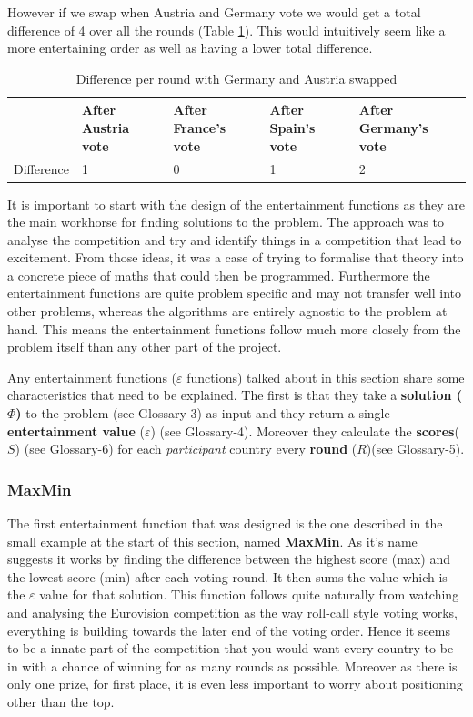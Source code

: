 \documentclass[12pt]{report}
\begin{document}
However if we swap when Austria and Germany vote we would get a total difference of 4 over all the rounds (Table \ref{t_simpleDifferences2}). This would intuitively seem like a more entertaining order as well as having a lower total difference.

\begin{table}[H]
\centering
\caption{Difference per round with Germany and Austria swapped}
\label{t_simpleDifferences2}
\begin{tabular}{|l|l|l|l|l|}
\hline
        & After Austria vote & After France's vote & After Spain's vote & After Germany's vote \\ \hline
Difference & 1                    & 0                  & 1                   & 2                    \\ \hline
\end{tabular}
\end{table}

It is important to start with the design of the entertainment functions as they are the main workhorse for finding solutions to the problem. The approach was to analyse the competition and try and identify things in a competition that lead to excitement. From those ideas, it was a case of trying to formalise that theory into a concrete piece of maths that could then be programmed. Furthermore the entertainment functions are quite problem specific and may not transfer well into other problems, whereas the algorithms are entirely agnostic to the problem at hand. This means the entertainment functions follow much more closely from the problem itself than any other part of the project.

Any entertainment functions ($\varepsilon$ functions) talked about in this section share some characteristics that need to be explained. The first is that they take a \textbf{solution ($\Phi$)} to the problem (see Glossary-3) as input and they return a single \textbf{entertainment value} ($\varepsilon$) (see Glossary-4). Moreover they calculate the \textbf{scores}($S$) (see Glossary-6) for each \textit{participant} country every \textbf{round} ($R$)(see Glossary-5).

\subsubsection{MaxMin}
The first entertainment function that was designed is the one described in the small example at the start of this section, named \textbf{MaxMin}. As it's name suggests it works by finding the difference between the highest score (max) and the lowest score (min) after each voting round. It then sums the value which is the $\varepsilon$ value for that solution. This function follows quite naturally from watching and analysing the Eurovision competition as the way roll-call style voting works, everything is building towards the later end of the voting order. Hence it seems to be a innate part of the competition that you would want every country to be in with a chance of winning for as many rounds as possible. Moreover as there is only one prize, for first place, it is even less important to worry about positioning other than the top.
\end{document}
